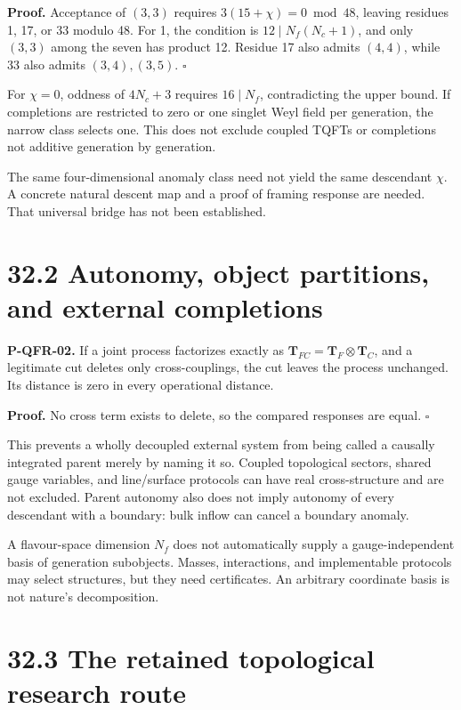 \documentclass[
  11pt,
  oneside]{book}
\begin{document}
\textbf{Proof.} Acceptance of \((3,3)\) requires
\(3(15+\chi)=0\bmod48\), leaving residues 1, 17, or 33 modulo 48. For 1,
the condition is \(12\mid N_f(N_c+1)\), and only \((3,3)\) among the
seven has product 12. Residue 17 also admits \((4,4)\), while 33 also
admits \((3,4),(3,5)\). \(\square\)

For \(\chi=0\), oddness of \(4N_c+3\) requires \(16\mid N_f\),
contradicting the upper bound. If completions are restricted to zero or
one singlet Weyl field per generation, the narrow class selects one.
This does not exclude coupled TQFTs or completions not additive
generation by generation.

The same four-dimensional anomaly class need not yield the same
descendant \(\chi\). A concrete natural descent map and a proof of
framing response are needed. That universal bridge has not been
established.

\section{32.2 Autonomy, object partitions, and external completions}

\label{p-qfr-02}{}

\textbf{P-QFR-02.} If a joint process factorizes exactly as
\(\mathbf T_{FC}=\mathbf T_F\otimes\mathbf T_C\), and a legitimate cut
deletes only cross-couplings, the cut leaves the process unchanged. Its
distance is zero in every operational distance.

\textbf{Proof.} No cross term exists to delete, so the compared
responses are equal. \(\square\)

This prevents a wholly decoupled external system from being called a
causally integrated parent merely by naming it so. Coupled topological
sectors, shared gauge variables, and line/surface protocols can have
real cross-structure and are not excluded. Parent autonomy also does not
imply autonomy of every descendant with a boundary: bulk inflow can
cancel a boundary anomaly.

A flavour-space dimension \(N_f\) does not automatically supply a
gauge-independent basis of generation subobjects. Masses, interactions,
and implementable protocols may select structures, but they need
certificates. An arbitrary coordinate basis is not nature's
decomposition.

\section{32.3 The retained topological research route}
\end{document}
